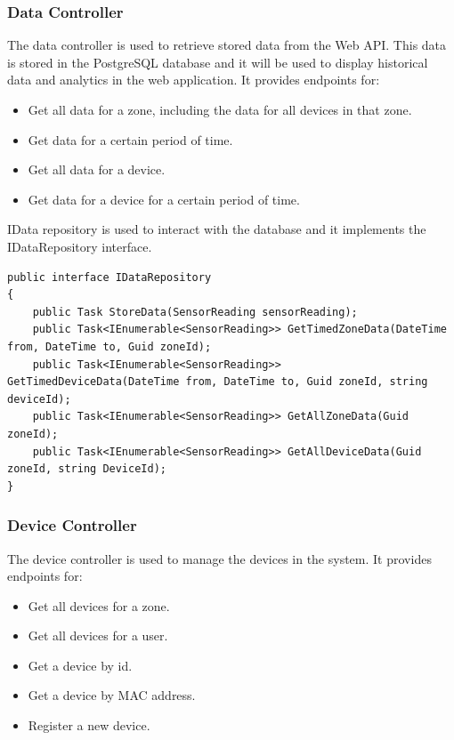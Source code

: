 \subsubsection{Data Controller}
The data controller is used to retrieve stored data from the Web API. This data is stored in the PostgreSQL database and
it will be used to display historical data and analytics in the web application.
It provides endpoints for:
\begin{itemize}
    \item Get all data for a zone, including the data for all devices in that zone.
    \item Get data for a certain period of time.
    \item Get all data for a device.
    \item Get data for a device for a certain period of time.
\end{itemize}

IData repository is used to interact with the database and it implements the IDataRepository interface.
\begin{lstlisting}
public interface IDataRepository
{
    public Task StoreData(SensorReading sensorReading);
    public Task<IEnumerable<SensorReading>> GetTimedZoneData(DateTime from, DateTime to, Guid zoneId);
    public Task<IEnumerable<SensorReading>> GetTimedDeviceData(DateTime from, DateTime to, Guid zoneId, string deviceId);
    public Task<IEnumerable<SensorReading>> GetAllZoneData(Guid zoneId);
    public Task<IEnumerable<SensorReading>> GetAllDeviceData(Guid zoneId, string DeviceId);
}
\end{lstlisting}
\subsubsection{Device Controller}
The device controller is used to manage the devices in the system.
It provides endpoints for:
\begin{itemize}
    \item Get all devices for a zone.
    \item Get all devices for a user.
    \item Get a device by id.
    \item Get a device by MAC address.
    \item Register a new device.
\end{itemize}

